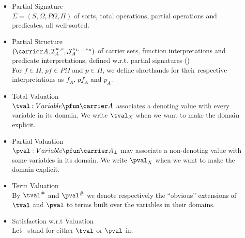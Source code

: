\begin{itemize}
  \item Partial Signature 
    \\ $\Sigma = (S,\Omega,P\Omega,\Pi)$
       of sorts, total operations, partial operations and predicates,
       all well-sorted.
  \item Partial Structure 
    \\ $(\carrier A,\mathcal I^{w,s}_A,\mathcal J^{s_1,\ldots,s_n}_A)$
    of carrier sets,
    function interpretations
    and predicate interpretations,
    defined w.r.t. partial signatures ()
    \\ For $f \in \Omega$, $pf \in P\Omega$
       and $p \in \Pi$, we define shorthands
       for their respective interpretations as $f_A$, $pf_A$ and $p_A$.
  \item Total Valuation 
    \\ $\tval : Variable \pfun \carrier A$ associates a denoting value
       with every variable in its domain.
       We write $\tval_X$ when we want to make the domain explicit.
  \item Partial Valuation 
    \\ $\pval : Variable \pfun \carrier A_\bot$ may associate a non-denoting value
       with some variables in its domain.
       We write $\pval_X$ when we want to make the domain explicit.
  \item Term Valuation 
    \\ By $\tval^\#$ and $\pval^\#$ we denote respectively
    the ``obvious'' extensions of $\tval$ and $\pval$ to
    terms built over the variables in their domains.
  \item Satisfaction w.r.t Valuation 
    \\ Let \val\ stand for either $\tval$ or $\pval$ in:
\end{itemize}
